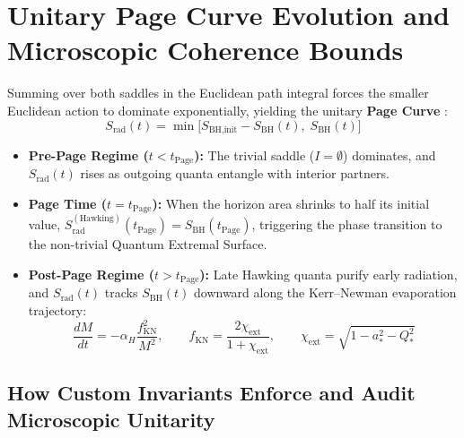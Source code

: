 \documentclass[11pt,a4paper]{article}
\begin{document}
\section{Unitary Page Curve Evolution and Microscopic Coherence Bounds}

Summing over both saddles in the Euclidean path integral forces the smaller Euclidean action to dominate exponentially, yielding the unitary \textbf{Page Curve} \cite{Page1993}:
\begin{equation}
S_{\text{rad}}(t) = \min\big[S_{\text{BH,init}} - S_{\text{BH}}(t),\; S_{\text{BH}}(t)\big]
\end{equation}
\begin{itemize}
\item \textbf{Pre-Page Regime ($t < t_{\text{Page}}$):} The trivial saddle ($I = \emptyset$) dominates, and $S_{\text{rad}}(t)$ rises as outgoing quanta entangle with interior partners.
\item \textbf{Page Time ($t = t_{\text{Page}}$):} When the horizon area shrinks to half its initial value, $S_{\text{rad}}^{(\text{Hawking})}(t_{\text{Page}}) = S_{\text{BH}}(t_{\text{Page}})$, triggering the phase transition to the non-trivial Quantum Extremal Surface.
\item \textbf{Post-Page Regime ($t > t_{\text{Page}}$):} Late Hawking quanta purify early radiation, and $S_{\text{rad}}(t)$ tracks $S_{\text{BH}}(t)$ downward along the Kerr--Newman evaporation trajectory:
\begin{equation}
\frac{dM}{dt} = -\alpha_H \frac{f_{\text{KN}}^2}{M^2}, \qquad f_{\text{KN}} = \frac{2\chi_{\text{ext}}}{1 + \chi_{\text{ext}}}, \qquad \chi_{\text{ext}} = \sqrt{1 - a_*^2 - Q_*^2}
\end{equation}
\end{itemize}

\subsection{How Custom Invariants Enforce and Audit Microscopic Unitarity}
\end{document}

